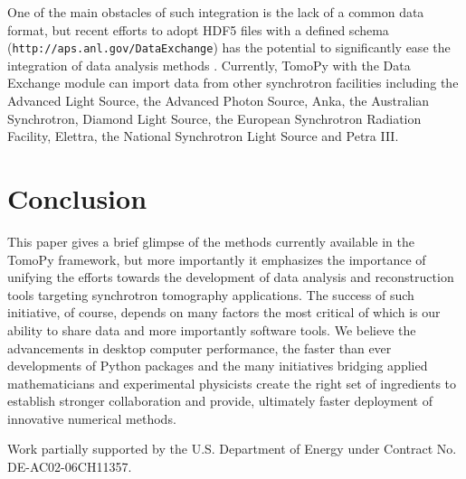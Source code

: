 \documentclass[pdf]{iucr}              %
\begin{document}
One of the main obstacles of such integration is the lack of a common data format, but recent efforts to adopt HDF5 files with a defined schema (\texttt{http://aps.anl.gov/DataExchange}) has the potential to significantly ease the integration of data analysis methods \cite{Francesco2014}. Currently, TomoPy with the Data Exchange module can import data from other synchrotron facilities including the Advanced Light Source, the Advanced Photon Source, Anka, the Australian Synchrotron, Diamond Light Source, the European Synchrotron Radiation Facility, Elettra, the National Synchrotron Light Source and Petra III.

\section{Conclusion}

This paper gives a brief glimpse of the methods currently available in the TomoPy framework, but more importantly it emphasizes the importance of unifying the efforts towards the development of data analysis and reconstruction tools targeting synchrotron tomography applications. The success of such initiative, of course, depends on many factors the most critical of which is our ability to share data and more importantly software tools. We believe the advancements in desktop computer performance, the faster than ever developments of Python packages and the many initiatives bridging applied mathematicians and experimental physicists create the right set of ingredients to establish stronger collaboration and provide, ultimately faster deployment of innovative numerical methods.





Work partially supported by the U.S. Department of Energy under Contract No. DE-AC02-06CH11357. 


\end{document}
